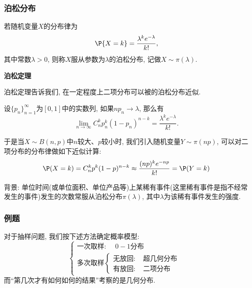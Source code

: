 \documentclass[11pt]{ctexart}
\begin{document}
\subsubsection{泊松分布}

若随机变量$X$的分布律为
\begin{equation*}
	\P \{X = k\} = \frac{\lambda^k e^{-\lambda}}{k !}, 
\end{equation*}
其中常数$\lambda > 0$, 则称$X$服从参数为$\lambda$的泊松分布, 记做$X \sim \pi(\lambda)$. 

\noindent\textbf{\large\keben 泊松定理}

泊松定理告诉我们, 在一定程度上二项分布可以被的泊松分布近似. 


\begin{theorem}[泊松极限定理]
	设$\{p_n\}_{n=1}^\infty$为$[0,1]$中的实数列, 如果$n p_n \to \lambda$, 那么有
	\begin{equation*}
		\lim_{n \to \infty} C_n^k p_n^k (1-p_n)^{n-k} = \frac{\lambda^k e^{-\lambda}}{k !}. 
	\end{equation*}
\end{theorem}

于是当$X \sim B(n,p)$中$n$较大、$p$较小时, 我们引入随机变量$Y \sim \pi(np)$, 可以对二项分布的分布律做如下近似计算: 
\begin{equation*}
	\P(X = k) = C_n^k p^k (1-p)^{n-k} \approx \frac{(np)^k e^{-np}}{k!} = \P(Y = k)
\end{equation*}

背景: 单位时间(或单位面积、单位产品等)上某稀有事件(这里稀有事件是指不经常发生的事件)发生的次数常服从泊松分布$\pi(\lambda)$, 其中$\lambda$为该稀有事件发生的强度. 

\subsubsection{例题}

对于抽样问题, 我们按下述方法确定概率模型: 
\begin{equation*}
	\begin{cases}
		\textbf{一次取样: } \quad \text{$0-1$分布} \\
		\textbf{多次取样} 
			\begin{cases}
				\textbf{无放回: } &\text{超几何分布 } \\
				\textbf{有放回: } &\text{二项分布 }
			\end{cases}
	\end{cases}
\end{equation*}
而“第几次才有如何如何的结果”考察的是几何分布. 
\end{document}
